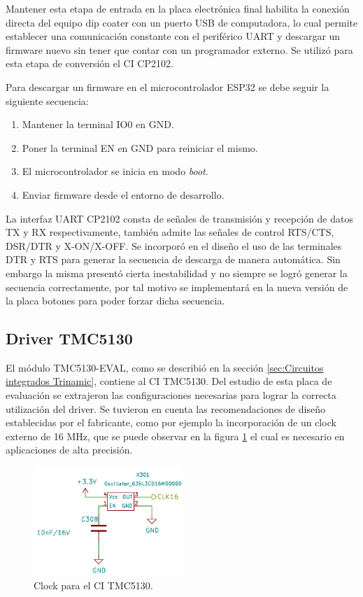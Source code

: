 Mantener esta etapa de entrada en la placa electrónica final habilita la conexión directa del equipo dip coater con un puerto USB de computadora, lo cual permite establecer una comunicación constante con el periférico UART y descargar un firmware nuevo sin tener que contar con un programador externo. Se utilizó para esta etapa de conversión el CI CP2102.

Para descargar un firmware en el microcontrolador ESP32 se debe seguir la siguiente secuencia:
\begin{enumerate}
\item Mantener la terminal IO0 en GND.
\item Poner la terminal EN en GND para reiniciar el mismo.
\item El microcontrolador se inicia en modo \textit{boot}.
\item Enviar firmware desde el entorno de desarrollo. 
\end{enumerate}

La interfaz UART CP2102 consta de señales de transmisión y recepción de datos TX y RX respectivamente, también admite las señales de control RTS/CTS, DSR/DTR y X-ON/X-OFF. Se incorporó en el diseño el uso de las terminales DTR y RTS para generar la secuencia de descarga de manera automática. Sin embargo la misma presentó cierta inestabilidad y no siempre se logró generar la secuencia correctamente, por tal motivo se implementará en la nueva versión de la placa botones para poder forzar dicha secuencia.



\subsection{Driver TMC5130}

El módulo TMC5130-EVAL, como se describió en la sección \ref{sec:Circuitos integrados Trinamic}, contiene al CI TMC5130. Del estudio de esta placa de evaluación se extrajeron las configuraciones necesarias para lograr la correcta utilización del driver. Se tuvieron en cuenta las recomendaciones de diseño establecidas por el fabricante, como por ejemplo la incorporación de un clock externo de 16 MHz, que se puede observar en la figura \ref{fig:kicad_clock} el cual es necesario en aplicaciones de alta precisión. 

\begin{figure}[h!]
	\centering
	\includegraphics[width=0.5\textwidth]{./Figures/kicad_clock.png}
	\caption{Clock para el CI TMC5130.}
	\label{fig:kicad_clock}
\end{figure}



